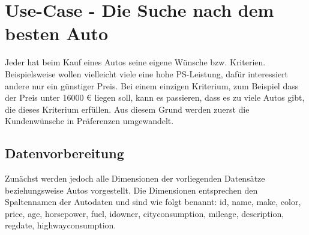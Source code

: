 \chapter{Use-Case - Die Suche nach dem besten Auto}
\label{ch:useCase}
Jeder hat beim Kauf eines Autos seine eigene Wünsche bzw. Kriterien. Beispielsweise wollen vielleicht viele eine hohe PS-Leistung, dafür interessiert andere nur ein günstiger Preis. Bei einem einzigen Kriterium, zum Beispiel dass der Preis unter 16000 \euro{} liegen soll, kann es passieren, dass es zu viele Autos gibt, die dieses Kriterium erfüllen. Aus diesem Grund werden zuerst die Kundenwünsche in Präferenzen umgewandelt.
\section{Datenvorbereitung}
\label{ch:Evaluierung:sec:vorbereitung}
Zunächst werden jedoch alle Dimensionen der vorliegenden Datensätze beziehungsweise Autos vorgestellt. Die Dimensionen entsprechen den Spaltennamen der Autodaten und sind wie folgt benannt: id, name, make, color, price, age, horsepower, fuel, idowner, city\textunderscore consumption, mileage, description, reg\textunderscore date, highway\textunderscore consumption.

